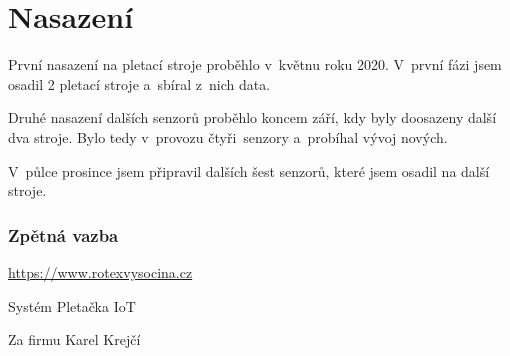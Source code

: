 \chapter{Nasazení}
První nasazení na pletací stroje proběhlo v~květnu roku 2020.
V~první fázi jsem osadil 2 pletací stroje a~sbíral z~nich data.

Druhé nasazení dalších senzorů proběhlo koncem září, kdy byly doosazeny další dva stroje.
Bylo tedy v~provozu čtyři~senzory a~probíhal vývoj nových.

V~půlce prosince jsem připravil dalších šest senzorů, které jsem osadil na další stroje.


\subsection{Zpětná vazba}
\newline
\url{https://www.rotexvysocina.cz}

Systém Pletačka IoT 

{\raggedleft Za firmu Karel Krejčí\par}



\newpage